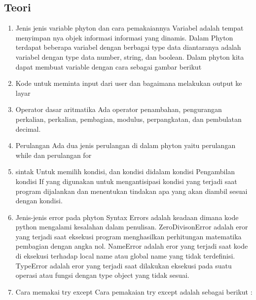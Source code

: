 \subsection{Teori}
\begin{enumerate}
    \item Jenis jenis variable phyton dan cara pemakaiannya
Variabel adalah tempat menyimpan nya objek informasi informasi yang dinamis. Dalam Phyton terdapat beberapa variabel dengan berbagai type data diantaranya adalah variabel dengan type data number, string, dan boolean. Dalam phyton kita dapat membuat variable dengan cara sebagai gambar berikut
   
    \item Kode untuk meminta input dari user dan bagaimana melakukan output ke layar
 
    \item Operator dasar aritmatika
Ada operator penambahan, pengurangan perkalian, perkalian, pembagian, modulus, perpangkatan, dan pembulatan decimal.

    \item Perulangan
Ada dua jenis perulangan di dalam phyton yaitu perulangan while dan perulangan for
 
 
    \item sintak Untuk memilih kondisi, dan kondisi didalam kondisi
Pengambilan kondisi If yang digunakan untuk mengantisipasi kondisi yang terjadi saat program dijalankan dan menentukan tindakan apa yang akan diambil sesuai dengan kondisi.
  
  
  

    \item Jenis-jenis error pada phyton
Syntax Errors adalah keadaan dimana kode python mengalami kesalahan dalam penulisan. 
ZeroDivisonError adalah eror yang terjadi saat eksekusi program menghasilkan perhitungan matematika pembagian dengan angka nol.
NameError adalah eror yang terjadi saat kode di eksekusi terhadap local name atau global name yang tidak terdefinisi. 
TypeError adalah eror yang terjadi saat dilakukan eksekusi pada suatu operasi atau fungsi dengan type object yang tidak sesuai.

    \item Cara memakai try except
Cara pemakaian try except adalah sebagai berikut :



\end{enumerate}

